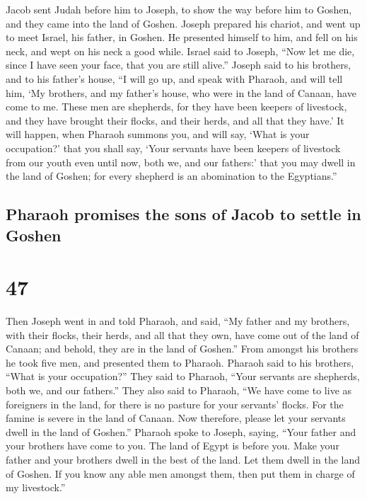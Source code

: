  Jacob sent Judah before him to Joseph, to show the way
before him to Goshen, and they came into the land of Goshen.
 Joseph prepared his chariot, and went up to meet Israel,
his father, in Goshen. He presented himself to him, and fell on his
neck, and wept on his neck a good while.  Israel said to
Joseph, ``Now let me die, since I have seen your face, that you are
still alive.''  Joseph said to his brothers, and to his
father's house, ``I will go up, and speak with Pharaoh, and will tell
him, `My brothers, and my father's house, who were in the land of
Canaan, have come to me.  These men are shepherds, for
they have been keepers of livestock, and they have brought their flocks,
and their herds, and all that they have.'  It will
happen, when Pharaoh summons you, and will say, `What is your
occupation?'  that you shall say, `Your servants have
been keepers of livestock from our youth even until now, both we, and
our fathers:' that you may dwell in the land of Goshen; for every
shepherd is an abomination to the Egyptians.''

\hypertarget{pharaoh-promises-the-sons-of-jacob-to-settle-in-goshen}{%
\subsection{Pharaoh promises the sons of Jacob to settle in
Goshen}\label{pharaoh-promises-the-sons-of-jacob-to-settle-in-goshen}}

\hypertarget{section-46}{%
\section{47}\label{section-46}}

 Then Joseph went in and told Pharaoh, and said, ``My
father and my brothers, with their flocks, their herds, and all that
they own, have come out of the land of Canaan; and behold, they are in
the land of Goshen.''  From amongst his brothers he took
five men, and presented them to Pharaoh.  Pharaoh said to
his brothers, ``What is your occupation?'' They said to Pharaoh, ``Your
servants are shepherds, both we, and our fathers.''  They
also said to Pharaoh, ``We have come to live as foreigners in the land,
for there is no pasture for your servants' flocks. For the famine is
severe in the land of Canaan. Now therefore, please let your servants
dwell in the land of Goshen.''  Pharaoh spoke to Joseph,
saying, ``Your father and your brothers have come to you. 
The land of Egypt is before you. Make your father and your brothers
dwell in the best of the land. Let them dwell in the land of Goshen. If
you know any able men amongst them, then put them in charge of my
livestock.''

